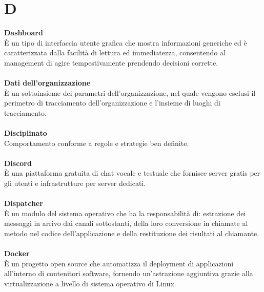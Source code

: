 \section{D}
\textbf{Dashboard}\\
È un tipo di interfaccia utente grafica che mostra informazioni generiche ed è caratterizzata dalla facilità di lettura ed immediatezza, consentendo al management di agire tempestivamente prendendo decisioni corrette. \\ \\
\textbf{Dati dell'organizzazione}\\
È un sottoinsieme dei parametri dell'organizzazione, nel quale vengono esclusi il perimetro di tracciamento dell'organizzazione e l'insieme di luoghi di tracciamento. \\ \\
\textbf{Disciplinato}\\
Comportamento conforme a regole e strategie ben definite. \\ \\
\textbf{Discord}\\
È una piattaforma gratuita di chat vocale e testuale che fornisce server gratis per gli utenti e infrastrutture per server dedicati. \\ \\
\textbf{Dispatcher}\\
È un modulo del sistema operativo che ha la responsabilità di: estrazione dei messaggi in arrivo dai canali sottostanti, della loro conversione in chiamate al metodo nel codice dell'applicazione e della restituzione dei risultati al chiamante. \\ \\
\textbf{Docker}\\
È un progetto open source che automatizza il deployment di applicazioni all'interno di contenitori software, fornendo un'astrazione aggiuntiva grazie alla virtualizzazione a livello di sistema operativo di Linux. \\ \\
\clearpage